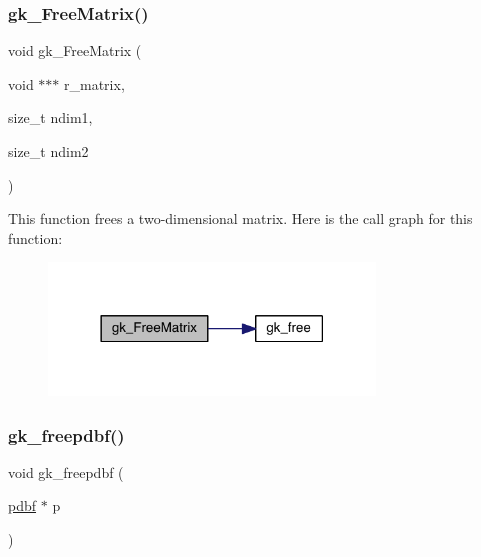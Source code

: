 \mbox{\label{a00077_a24f17b8016f192e6e6dfc6e9bf7be10d}} 
\subsubsection{\texorpdfstring{gk\+\_\+\+Free\+Matrix()}{gk\_FreeMatrix()}}
{\footnotesize\ttfamily void gk\+\_\+\+Free\+Matrix (\begin{DoxyParamCaption}\item[{void $\ast$$\ast$$\ast$}]{r\+\_\+matrix,  }\item[{size\+\_\+t}]{ndim1,  }\item[{size\+\_\+t}]{ndim2 }\end{DoxyParamCaption})}

This function frees a two-\/dimensional matrix. Here is the call graph for this function\+:\nopagebreak
\begin{figure}[H]
\begin{center}
\leavevmode
\includegraphics[width=246pt]{a00077_a24f17b8016f192e6e6dfc6e9bf7be10d_cgraph}
\end{center}
\end{figure}
\mbox{\label{a00077_ab49542f55191276b91d65ad61a198ab2}} 
\subsubsection{\texorpdfstring{gk\+\_\+freepdbf()}{gk\_freepdbf()}}
{\footnotesize\ttfamily void gk\+\_\+freepdbf (\begin{DoxyParamCaption}\item[{\hyperlink{a00666}{pdbf} $\ast$}]{p }\end{DoxyParamCaption})}



